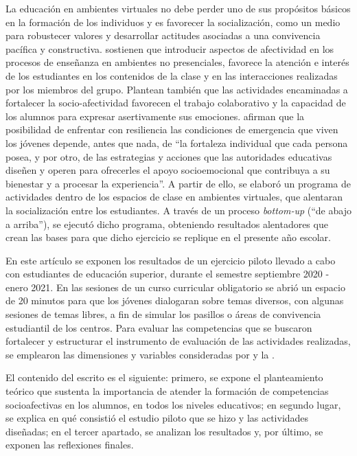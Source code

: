 \documentclass[spanish]{textolivre}
\begin{document}
La educación en ambientes virtuales no debe perder uno de sus propósitos básicos en la formación de los individuos y es favorecer la socialización, como un medio para robustecer valores y desarrollar actitudes asociadas a una convivencia pacífica y constructiva. \textcite{briztena2020} sostienen que introducir aspectos de afectividad en los procesos de enseñanza en ambientes no presenciales, favorece la atención e interés de los estudiantes en los contenidos de la clase y en las interacciones realizadas por los miembros del grupo. Plantean también que las actividades encaminadas a fortalecer la socio-afectividad favorecen el trabajo colaborativo y la capacidad de los alumnos para expresar asertivamente sus emociones. \textcite[p. 50]{lopez2021} afirman que la posibilidad de enfrentar con resiliencia las condiciones de emergencia que viven los jóvenes depende, antes que nada, de “la fortaleza individual que cada persona posea, y por otro, de las estrategias y acciones que las autoridades educativas diseñen y operen para ofrecerles el apoyo socioemocional que contribuya a su bienestar y a procesar la experiencia”. A partir de ello, se elaboró un programa de actividades dentro de los espacios de clase en ambientes virtuales, que alentaran la socialización entre los estudiantes. A través de un proceso \emph{bottom-up} (“de abajo a arriba”), se ejecutó dicho programa, obteniendo resultados alentadores que crean las bases para que dicho ejercicio se replique en el presente año escolar. 

En este artículo se exponen los resultados de un ejercicio piloto llevado a cabo con estudiantes de educación superior, durante el semestre septiembre 2020 - enero 2021. En las sesiones de un curso curricular obligatorio se abrió un espacio de 20 minutos para que los jóvenes dialogaran sobre temas diversos, con algunas sesiones de temas libres, a fin de simular los pasillos o áreas de convivencia estudiantil de los centros. Para evaluar las competencias que se buscaron fortalecer y estructurar el instrumento de evaluación de las actividades realizadas, se emplearon las dimensiones y variables consideradas por \textcite{mikulic2015} y la \textcite{secretaria2018}.

El contenido del escrito es el siguiente: primero, se expone el planteamiento teórico que sustenta la importancia de atender la formación de competencias socioafectivas en los alumnos, en todos los niveles educativos; en segundo lugar, se explica en qué consistió el estudio piloto que se hizo y las actividades diseñadas; en el tercer apartado, se analizan los resultados y, por último, se exponen las reflexiones finales.
\end{document}
